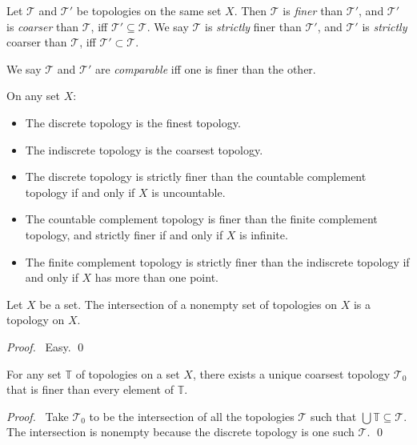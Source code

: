 \begin{df}
Let $\mathcal{T}$ and $\mathcal{T}'$ be topologies on the same set $X$. Then $\mathcal{T}$ is \emph{finer} than $\mathcal{T}'$, and $\mathcal{T}'$ is \emph{coarser} than $\mathcal{T}$, iff $\mathcal{T}' \subseteq \mathcal{T}$. We say $\mathcal{T}$ is \emph{strictly} finer than
$\mathcal{T}'$, and $\mathcal{T}'$ is \emph{strictly} coarser than $\mathcal{T}$, iff $\mathcal{T}' \subset \mathcal{T}$.

We say $\mathcal{T}$ and $\mathcal{T}'$ are \emph{comparable} iff one is finer than the other.
\end{df}

\begin{ex}
  On any set $X$:
  \begin{itemize}
    \item The discrete topology is the finest topology.
    \item The indiscrete topology is the coarsest topology.
    \item The discrete topology is strictly finer than the countable complement topology if and only if $X$ is uncountable.
    \item The countable complement topology is finer than the finite complement topology, and strictly finer if and only if $X$ is infinite.
    \item The finite complement topology is strictly finer than the indiscrete topology if and only if $X$ has more than one point.
  \end{itemize}
\end{ex}

\begin{prop}
  Let $X$ be a set. The intersection of a nonempty set of topologies on $X$ is a topology on $X$.
\end{prop}

\begin{proof}
  \pf\ Easy. \qed
\end{proof}

\begin{cor}
  For any set $\mathbb{T}$ of topologies on a set $X$, there exists a unique coarsest topology $\mathcal{T}_0$ that is finer than every element of $\mathbb{T}$.
\end{cor}

\begin{proof}
  \pf\ Take $\mathcal{T}_0$ to be the intersection of all the topologies $\mathcal{T}$ such that $\bigcup \mathbb{T} \subseteq \mathcal{T}$. The intersection is nonempty because the discrete topology is one such $\mathcal{T}$. \qed
\end{proof}

